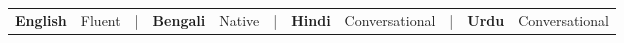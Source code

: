 





\begin{center}
\fontsize{9pt}{1em}\bodyfont\color{graytext}
\begin{tabular}{lllllllllll} %
    \textbf{English} & Fluent&    |&
    \textbf{Bengali} & Native&          |&
    \textbf{Hindi}   & Conversational&  |&
    \textbf{Urdu}    & Conversational
\end{tabular}
\end{center}



